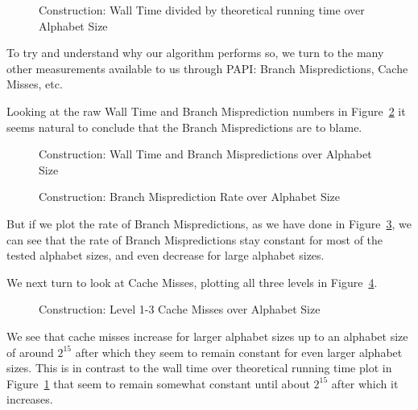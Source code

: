\begin{figure}
	
	\caption{Construction: Wall Time divided by theoretical running time over Alphabet Size}
	\label{fig:naiveIntegerAlphabetSize_WallTime}
\end{figure}

To try and understand why our algorithm performs so, we turn to the many other measurements available to us through PAPI: Branch Mispredictions, Cache Misses, etc.

Looking at the raw Wall Time and Branch Misprediction numbers in Figure~\ref{fig:naiveIntegerAlphabetSize_WallTime_BM} it seems natural to conclude that the Branch Mispredictions are to blame.
\begin{figure}
	
	\caption{Construction: Wall Time and Branch Mispredictions over Alphabet Size}
	\label{fig:naiveIntegerAlphabetSize_WallTime_BM}
\end{figure}
\begin{figure}

\caption{Construction: Branch Misprediction Rate over Alphabet Size}
\label{fig:naiveIntegerAlphabetSize_BMRate}
\end{figure}
But if we plot the rate of Branch Mispredictions, as we have done in Figure~\ref{fig:naiveIntegerAlphabetSize_BMRate}, we can see that the rate of Branch Mispredictions stay constant for most of the tested alphabet sizes, and even decrease for large alphabet sizes.

We next turn to look at Cache Misses, plotting all three levels in Figure~\ref{fig:naiveIntegerAlphabetSize_CM}.
\begin{figure}

\caption{Construction: Level 1-3 Cache Misses over Alphabet Size}
\label{fig:naiveIntegerAlphabetSize_CM}
\end{figure}
We see that cache misses increase for larger alphabet sizes up to an alphabet size of around $2^{15}$ after which they seem to remain constant for even larger alphabet sizes.
This is in contrast to the wall time over theoretical running time plot in Figure~\ref{fig:naiveIntegerAlphabetSize_WallTime} that seem to remain somewhat constant until about $2^{15}$ after which it increases.

